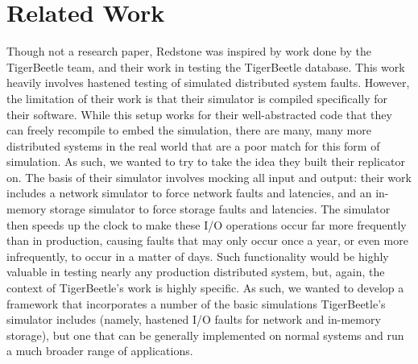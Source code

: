\section{Related Work}

{\fontsize{12}{15}\selectfont 
Though not a research paper,
Redstone was inspired by work done by the TigerBeetle team,
and their work in testing the TigerBeetle database.
This work heavily involves hastened testing of simulated distributed system faults.
However, the limitation of their work is that their simulator is compiled specifically for their software.
While this setup works for their well-abstracted code that they can freely recompile to embed the simulation,
there are many, many more distributed systems in the real world that are a poor match for this form of simulation.
As such, we wanted to try to take the idea they built their replicator on.
The basis of their simulator involves mocking all input and output:
their work includes a network simulator to force network faults and latencies,
and an in-memory storage simulator to force storage faults and latencies.
The simulator then speeds up the clock to make these I/O operations occur far more frequently than in production,
causing faults that may only occur once a year, or even more infrequently, to occur in a matter of days.
Such functionality would be highly valuable in testing nearly any production distributed system,
but, again, the context of TigerBeetle’s work is highly specific.
As such, we wanted to develop a framework that incorporates a number of the basic simulations TigerBeetle’s simulator includes
(namely, hastened I/O faults for network and in-memory storage),
but one that can be generally implemented on normal systems and run a much broader range of applications.
}

% 

